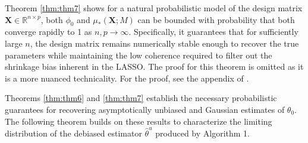 \documentclass{article}
\begin{document}
\noindent
Theorem \ref{thm:thm7} shows for a natural probabilistic model of the design matrix $\mathbf{X}\in \mathbb{R}^{n\times p}$, both $\phi_0$ and $\mu_*(\mathbf{X}; M)$ can be bounded with probability that both converge rapidly to 1 as $n,p \to \infty$. Specifically, it guarantees that for sufficiently large $n$, the design matrix remains numerically stable enough to recover the true parameters while maintaining the low coherence required to filter out the shrinkage bias inherent in the LASSO. The proof for this theorem is omitted as it is a more nuanced technicality. For the proof, see the appendix of \citet{javanmard14a}.

Theorems \ref{thm:thm6} and \ref{thm:thm7} establish the necessary probabilistic guarantees for recovering asymptotically unbiased and Gaussian estimates of $\theta_0$. The following theorem builds on these results to characterize the limiting distribution of the debiased estimator $\hat{\theta}^u$ produced by Algorithm 1.
\end{document}
